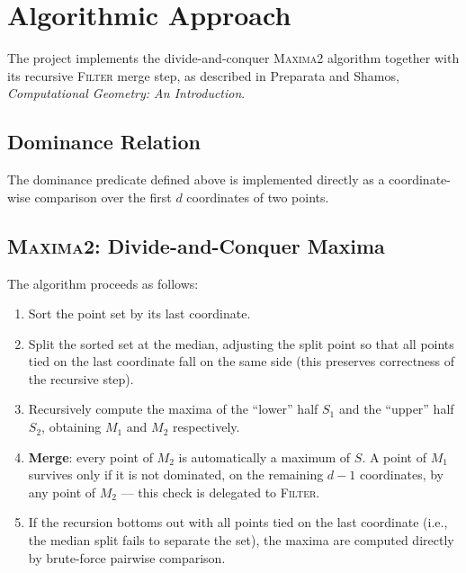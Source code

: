 \documentclass[11pt]{article}
\begin{document}
\section{Algorithmic Approach}

The project implements the divide-and-conquer \textsc{Maxima2} algorithm
together with its recursive \textsc{Filter} merge step, as described in
Preparata and Shamos, \emph{Computational Geometry: An Introduction}.

\subsection{Dominance Relation}

The dominance predicate defined above is implemented directly as a
coordinate-wise comparison over the first $d$ coordinates of two points.



\subsection{\textsc{Maxima2}: Divide-and-Conquer Maxima}

The algorithm proceeds as follows:
\begin{enumerate}
    \item Sort the point set by its last coordinate.
    \item Split the sorted set at the median, adjusting the split point so
    that all points tied on the last coordinate fall on the same side
    (this preserves correctness of the recursive step).
    \item Recursively compute the maxima of the ``lower'' half $S_1$ and
    the ``upper'' half $S_2$, obtaining $M_1$ and $M_2$ respectively.
    \item \textbf{Merge}: every point of $M_2$ is automatically a maximum
    of $S$. A point of $M_1$ survives only if it is not dominated, on the
    remaining $d-1$ coordinates, by any point of $M_2$ --- this check is
    delegated to \textsc{Filter}.
    \item If the recursion bottoms out with all points tied on the last
    coordinate (i.e., the median split fails to separate the set), the
    maxima are computed directly by brute-force pairwise comparison.
\end{enumerate}
\end{document}
